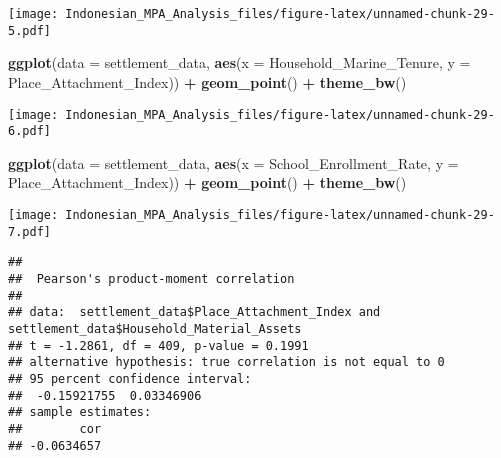 \documentclass[
]{article}
\newenvironment{Shaded}{\begin{snugshade}}{\end{snugshade}}
\newcommand{\AttributeTok}[1]{\textcolor[rgb]{0.13,0.29,0.53}{#1}}
\newcommand{\CommentTok}[1]{\textcolor[rgb]{0.56,0.35,0.01}{\textit{#1}}}
\newcommand{\FunctionTok}[1]{\textcolor[rgb]{0.13,0.29,0.53}{\textbf{#1}}}
\newcommand{\NormalTok}[1]{#1}
\newcommand{\SpecialCharTok}[1]{\textcolor[rgb]{0.81,0.36,0.00}{\textbf{#1}}}
\newcommand{\StringTok}[1]{\textcolor[rgb]{0.31,0.60,0.02}{#1}}
\begin{document}
\texttt{[image: Indonesian\_MPA\_Analysis\_files/figure-latex/unnamed-chunk-29-5.pdf]}

\begin{Shaded}
\begin{Highlighting}[]
\FunctionTok{ggplot}\NormalTok{(}\AttributeTok{data =}\NormalTok{ settlement\_data, }\FunctionTok{aes}\NormalTok{(}\AttributeTok{x =} \StringTok{\textasciigrave{}}\AttributeTok{Household\_Marine\_Tenure}\StringTok{\textasciigrave{}}\NormalTok{, }\AttributeTok{y =} \StringTok{\textasciigrave{}}\AttributeTok{Place\_Attachment\_Index}\StringTok{\textasciigrave{}}\NormalTok{)) }\SpecialCharTok{+}
  \FunctionTok{geom\_point}\NormalTok{() }\SpecialCharTok{+}
  \FunctionTok{theme\_bw}\NormalTok{()}
\end{Highlighting}
\end{Shaded}

\texttt{[image: Indonesian\_MPA\_Analysis\_files/figure-latex/unnamed-chunk-29-6.pdf]}

\begin{Shaded}
\begin{Highlighting}[]
\FunctionTok{ggplot}\NormalTok{(}\AttributeTok{data =}\NormalTok{ settlement\_data, }\FunctionTok{aes}\NormalTok{(}\AttributeTok{x =} \StringTok{\textasciigrave{}}\AttributeTok{School\_Enrollment\_Rate}\StringTok{\textasciigrave{}}\NormalTok{, }\AttributeTok{y =} \StringTok{\textasciigrave{}}\AttributeTok{Place\_Attachment\_Index}\StringTok{\textasciigrave{}}\NormalTok{)) }\SpecialCharTok{+}
  \FunctionTok{geom\_point}\NormalTok{() }\SpecialCharTok{+}
  \FunctionTok{theme\_bw}\NormalTok{()}
\end{Highlighting}
\end{Shaded}

\texttt{[image: Indonesian\_MPA\_Analysis\_files/figure-latex/unnamed-chunk-29-7.pdf]}

\begin{Shaded}
\end{Shaded}

\begin{verbatim}
## 
##  Pearson's product-moment correlation
## 
## data:  settlement_data$Place_Attachment_Index and settlement_data$Household_Material_Assets
## t = -1.2861, df = 409, p-value = 0.1991
## alternative hypothesis: true correlation is not equal to 0
## 95 percent confidence interval:
##  -0.15921755  0.03346906
## sample estimates:
##        cor 
## -0.0634657
\end{verbatim}
\end{document}
